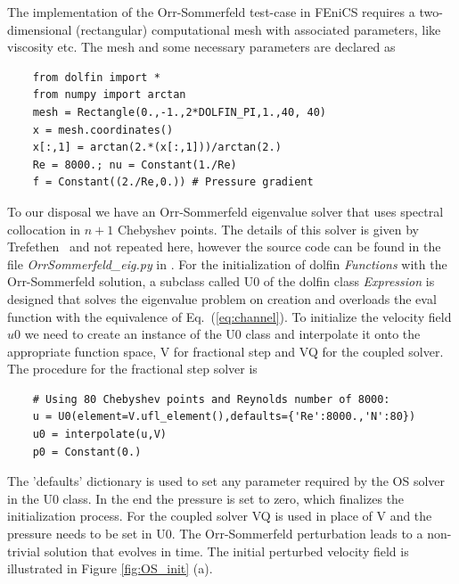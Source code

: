 The implementation of the Orr-Sommerfeld test-case in FEniCS requires a two-dimensional (rectangular) computational mesh with associated parameters, like viscosity etc. The  mesh and some necessary parameters are declared as
\begin{small}
\begin{verbatim}
    from dolfin import *
    from numpy import arctan
    mesh = Rectangle(0.,-1.,2*DOLFIN_PI,1.,40, 40)
    x = mesh.coordinates()
    x[:,1] = arctan(2.*(x[:,1]))/arctan(2.)
    Re = 8000.; nu = Constant(1./Re)
    f = Constant((2./Re,0.)) # Pressure gradient
\end{verbatim}
\end{small}
To our disposal we have an Orr-Sommerfeld eigenvalue solver that uses spectral collocation in $n+1$ Chebyshev points. The details of this solver is given by Trefethen~\cite{tref06} and not repeated here, however the source code can be found in the file \emph{OrrSommerfeld\_eig.py} in \cite{folder}. For the initialization of dolfin \emph{Functions} with the Orr-Sommerfeld solution, a subclass called U0 of the dolfin class \emph{Expression} is designed that solves the eigenvalue problem on creation and overloads the eval function with the equivalence of Eq.~(\ref{eq:channel}). To initialize the velocity field $u0$ we need to create an instance of the U0 class and interpolate it onto the appropriate function space, V for fractional step and VQ for the coupled solver. The procedure for the fractional step solver is
\begin{small}
\begin{verbatim}
    # Using 80 Chebyshev points and Reynolds number of 8000:
    u = U0(element=V.ufl_element(),defaults={'Re':8000.,'N':80})
    u0 = interpolate(u,V)
    p0 = Constant(0.)
\end{verbatim}
\end{small}
The 'defaults' dictionary is used to set any parameter required by the OS solver in the U0 class. In the end the pressure is set to zero, which finalizes the initialization process. For the coupled solver VQ is used in place of V and the pressure needs to be set in U0. The Orr-Sommerfeld perturbation leads to a non-trivial solution that evolves in time. The initial perturbed velocity field is illustrated in Figure \ref{fig:OS_init} (a).

